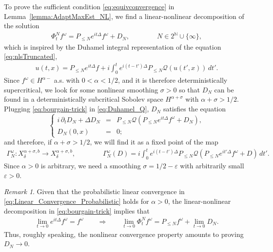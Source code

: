 \documentclass[11pt, xcolor = dvipsnames,reqno
]{amsart}
\theoremstyle{definition}
\theoremstyle{remark}
\newtheorem{rmk}[thm]{Remark}
\begin{document}
To prove the sufficient condition \eqref{eq:equivconvergence} in Lemma~\ref{lemma:AdaptMaxEst_NL}, 
we find a linear-nonlinear decomposition of the solution
\begin{align}\label{eq:bourgain-trick}
    \Phi^N_t f^\omega = P_{\leq N} e^{it\Delta} f^{\omega} + D_N, 
    \qquad \qquad N \in 2^{\mathbb N} \cup \{ \infty \}, 
\end{align}
which is inspired by the Duhamel integral representation of the equation \eqref{eq:nlsTruncated},
\begin{align}\label{eq:Duhamel_Q}
    u(t,x) = P_{\leq N} e^{it\Delta} f + i \int_0^t e^{i(t - t')\Delta}  P_{\leq N} \mathcal Q (u(t',x)) \, dt'.
\end{align}
Since $f^\omega \in H^{\alpha - }$ a.s.  with $0 < \alpha < 1/2$, 
and it is therefore deterministically supercritical, 
we look for some nonlinear smoothing $\sigma > 0$ so that $D_N$ can be found in a deterministically subcritical Sobolev space $H^{\alpha + \sigma}$ with $\alpha + \sigma > 1/2$. 
%
Plugging \eqref{eq:bourgain-trick} in \eqref{eq:Duhamel_Q}, $D_N$ satisfies the equation 
\begin{equation}\label{eq:cauchy-nls-v}
		\left\{
		\begin{array}{rcl}
			i \, \partial_t D_N + \Delta D_N 
            & = &  P_{\leq N} \mathcal Q ( P_{\leq N} e^{it\Delta} f^{\omega} + D_N ),  
			\\
			D_N(0,x) & = & 0;
		\end{array}
		\right.
\end{equation}
and therefore, if $\alpha + \sigma > 1/2$, we will find it as a fixed point of the map 
\begin{align}\label{eq:map-fp-prob}
    \Gamma_N^\omega : X^{ \alpha + \sigma , b}_{\delta} \rightarrow X^{ \alpha + \sigma , b}_{\delta}, 
    \qquad \qquad 
    \Gamma_N^{\omega}(D) = i \int_0^t e^{i(t - t')\Delta} P_{\leq N} \mathcal Q ( P_{\leq N} e^{i t' \Delta} f^{\omega} + D) \, dt'.
\end{align}
Since $\alpha > 0$ is arbitrary, 
we need a smoothing $\sigma = 1/2 - \varepsilon$ with arbitrarily small $\varepsilon > 0$. 


\begin{rmk}\label{rmk:D_to_0}
    Given that the probabilistic linear convergence in \eqref{eq:Linear_Convergence_Probabilistic} holds for $\alpha > 0$,       
    the linear-nonlinear decomposition in \eqref{eq:bourgain-trick} implies that 
    \begin{align}
        \lim_{t\to 0} e^{it\Delta}f^\omega = f^\omega 
        \qquad \Longrightarrow \qquad 
        \lim_{t\to 0} \Phi_t^N f^\omega = 
         P_{\leq N} f^{\omega}  + \lim_{t\to 0} D_N.
    \end{align}
    Thus, roughly speaking, the nonlinear convergence property amounts to proving $D_N \to 0$. 
\end{rmk}
\end{document}
